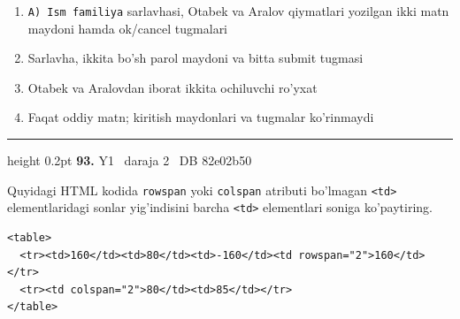 \documentclass[10pt,a4paper,oneside]{article}
\begin{document}
\begin{enumerate}[label=\Alph*),leftmargin=9mm]
\item \texttt{A) Ism familiya} sarlavhasi, Otabek va Aralov qiymatlari yozilgan ikki matn maydoni hamda ok/cancel tugmalari
\item Sarlavha, ikkita bo'sh parol maydoni va bitta submit tugmasi
\item Otabek va Aralovdan iborat ikkita ochiluvchi ro'yxat
\item Faqat oddiy matn; kiritish maydonlari va tugmalar ko'rinmaydi
\end{enumerate}
\vspace{2mm}\hrule height 0.2pt \vspace{4mm}
\hypertarget{q93}{\textbf{\color{ink}93.}}  {\color{muted}\scriptsize Y1 \textbullet\ daraja 2 \textbullet\ DB 82e02b50}
\par
Quyidagi HTML kodida \texttt{rowspan} yoki \texttt{colspan} atributi bo'lmagan \texttt{\textless{}td\textgreater{}} elementlaridagi sonlar yig'indisini barcha \texttt{\textless{}td\textgreater{}} elementlari soniga ko'paytiring.

\par
\begin{lstlisting}
<table>
  <tr><td>160</td><td>80</td><td>-160</td><td rowspan="2">160</td></tr>
  <tr><td colspan="2">80</td><td>85</td></tr>
</table>
\end{lstlisting}
\end{document}
